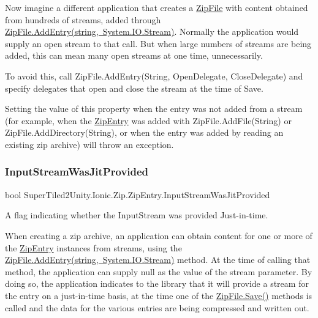 Now imagine a different application that creates a {\ttfamily \mbox{\hyperlink{class_super_tiled2_unity_1_1_ionic_1_1_zip_1_1_zip_file}{Zip\+File}}} with content obtained from hundreds of streams, added through \mbox{\hyperlink{class_super_tiled2_unity_1_1_ionic_1_1_zip_1_1_zip_file_a5ae21397e59e0699aa8701822477e537}{Zip\+File.\+Add\+Entry(string, System.\+I\+O.\+Stream)}}. Normally the application would supply an open stream to that call. But when large numbers of streams are being added, this can mean many open streams at one time, unnecessarily. 

To avoid this, call Zip\+File.\+Add\+Entry(\+String, Open\+Delegate,
  Close\+Delegate) and specify delegates that open and close the stream at the time of Save. 

Setting the value of this property when the entry was not added from a stream (for example, when the {\ttfamily \mbox{\hyperlink{class_super_tiled2_unity_1_1_ionic_1_1_zip_1_1_zip_entry}{Zip\+Entry}}} was added with Zip\+File.\+Add\+File(\+String) or Zip\+File.\+Add\+Directory(\+String), or when the entry was added by reading an existing zip archive) will throw an exception. \mbox{\label{class_super_tiled2_unity_1_1_ionic_1_1_zip_1_1_zip_entry_a621c95b01079d1bdc1fa2a3ade52676f}} 
\subsubsection{\texorpdfstring{Input\+Stream\+Was\+Jit\+Provided}{InputStreamWasJitProvided}}
{\footnotesize\ttfamily bool Super\+Tiled2\+Unity.\+Ionic.\+Zip.\+Zip\+Entry.\+Input\+Stream\+Was\+Jit\+Provided\hspace{0.3cm}{\ttfamily [get]}}



A flag indicating whether the Input\+Stream was provided Just-\/in-\/time. 

When creating a zip archive, an application can obtain content for one or more of the {\ttfamily \mbox{\hyperlink{class_super_tiled2_unity_1_1_ionic_1_1_zip_1_1_zip_entry}{Zip\+Entry}}} instances from streams, using the \mbox{\hyperlink{class_super_tiled2_unity_1_1_ionic_1_1_zip_1_1_zip_file_a5ae21397e59e0699aa8701822477e537}{Zip\+File.\+Add\+Entry(string, System.\+I\+O.\+Stream)}} method. At the time of calling that method, the application can supply null as the value of the stream parameter. By doing so, the application indicates to the library that it will provide a stream for the entry on a just-\/in-\/time basis, at the time one of the {\ttfamily \mbox{\hyperlink{class_super_tiled2_unity_1_1_ionic_1_1_zip_1_1_zip_file_aff8f1b3d07b66481e2629b04017a056f}{Zip\+File.\+Save()}}} methods is called and the data for the various entries are being compressed and written out. 

